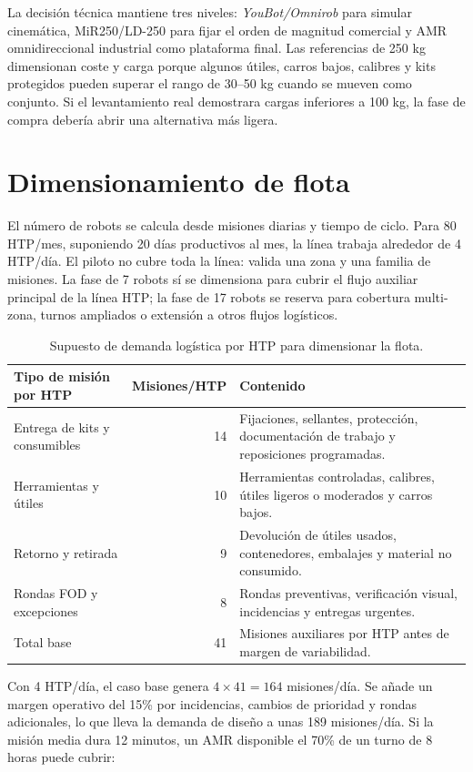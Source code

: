 La decisión técnica mantiene tres niveles: \textit{YouBot/Omnirob} para simular cinemática, MiR250/LD-250 para fijar el orden de magnitud comercial y AMR omnidireccional industrial como plataforma final. Las referencias de 250 kg dimensionan coste y carga porque algunos útiles, carros bajos, calibres y kits protegidos pueden superar el rango de 30--50 kg cuando se mueven como conjunto. Si el levantamiento real demostrara cargas inferiores a 100 kg, la fase de compra debería abrir una alternativa más ligera.

\section{Dimensionamiento de flota}

El número de robots se calcula desde misiones diarias y tiempo de ciclo. Para 80 HTP/mes, suponiendo 20 días productivos al mes, la línea trabaja alrededor de 4 HTP/día. El piloto no cubre toda la línea: valida una zona y una familia de misiones. La fase de 7 robots sí se dimensiona para cubrir el flujo auxiliar principal de la línea HTP; la fase de 17 robots se reserva para cobertura multi-zona, turnos ampliados o extensión a otros flujos logísticos.

\begin{table}[H]
\centering
\begin{tabularx}{\textwidth}{P{0.24\textwidth}rP{0.44\textwidth}}
\toprule
Tipo de misión por HTP & Misiones/HTP & Contenido\\
\midrule
Entrega de kits y consumibles & 14 & Fijaciones, sellantes, protección, documentación de trabajo y reposiciones programadas.\\
Herramientas y útiles & 10 & Herramientas controladas, calibres, útiles ligeros o moderados y carros bajos.\\
Retorno y retirada & 9 & Devolución de útiles usados, contenedores, embalajes y material no consumido.\\
Rondas FOD y excepciones & 8 & Rondas preventivas, verificación visual, incidencias y entregas urgentes.\\
\midrule
Total base & 41 & Misiones auxiliares por HTP antes de margen de variabilidad.\\
\bottomrule
\end{tabularx}
\caption{Supuesto de demanda logística por HTP para dimensionar la flota.}
\label{tab:misiones-htp}
\end{table}

Con 4 HTP/día, el caso base genera \(4 \times 41 = 164\) misiones/día. Se añade un margen operativo del 15\% por incidencias, cambios de prioridad y rondas adicionales, lo que lleva la demanda de diseño a unas 189 misiones/día. Si la misión media dura 12 minutos, un AMR disponible el 70\% de un turno de 8 horas puede cubrir:

